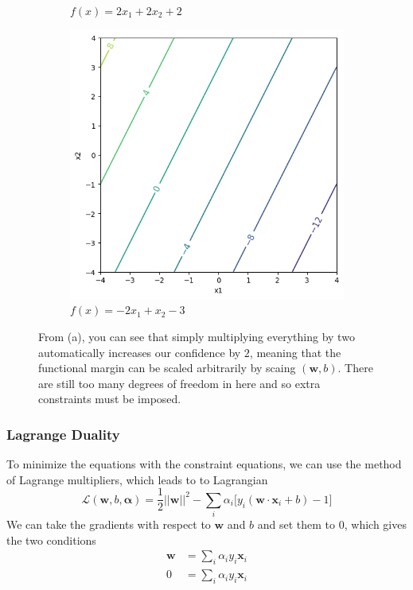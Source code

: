 \begin{figure}[H]
\begin{subfigure}[b]{0.32\textwidth}
      \caption{$f(x) = 2 x_1 + 2 x_2 + 2$} 
      \label{fig:two_times_scaled}
    \end{subfigure} 
    \hfill
    \begin{subfigure}[b]{0.32\textwidth} 
      \centering 
      \includegraphics[width=\textwidth]{img/scaling3.png} 
      \caption{$f(x) = -2x_1 + x_2 - 3$} 
      \label{fig:something_else}
    \end{subfigure} 
    \caption{From (a), you can see that simply multiplying everything by two automatically increases our confidence by $2$, meaning that the functional margin can be scaled arbitrarily by scaing $(\mathbf{w}, b)$. There are still too many degrees of freedom in here and so extra constraints must be imposed. } 
    \label{fig:scaling_problem} 
  \end{figure}

  \subsubsection{Lagrange Duality} 

    To minimize the equations with the constraint equations, we can use the method of Lagrange multipliers, which leads to to Lagrangian 
    \[\mathcal{L}(\mathbf{w}, b, \boldsymbol{\alpha}) = \frac{1}{2} ||\mathbf{w}||^2 - \sum_i \alpha_i \big[ y_i (\mathbf{w} \cdot \mathbf{x}_i + b) - 1\big]\]
    We can take the gradients with respect to $\mathbf{w}$ and $b$ and set them to $0$, which gives the two conditions 
    \begin{align*} 
      \mathbf{w} & = \sum_i \alpha_i y_i \mathbf{x}_i \\
      0 & = \sum_i \alpha_i y_i \mathbf{x}_i 
    \end{align*}

